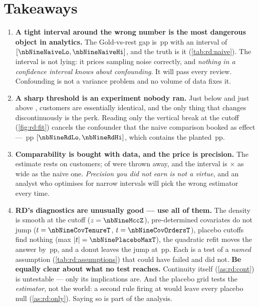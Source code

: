 \section{Takeaways}
\label{sec:rd:take}

\begin{enumerate}[leftmargin=*, itemsep=.45em]
  \item \textbf{A tight interval around the wrong number is the most dangerous object in
        analytics.} The Gold-vs-rest gap is \nbNineNaive{}\,pp with an interval of
        $[\nbNineNaiveLo, \nbNineNaiveHi]$, and the truth is \nbNineNaiveVerdict{} it
        (\cref{tab:rd:naive}). The interval is not lying: it prices sampling noise correctly, and
        \emph{nothing in a confidence interval knows about confounding}. It will pass every review.
        Confounding is not a variance problem and no volume of data fixes it.

  \item \textbf{A sharp threshold is an experiment nobody ran.} Just below and just above
        \eur{\nbNineCutoff}, customers are essentially identical, and the only thing that changes
        discontinuously is the perk. Reading only the vertical break at the cutoff
        (\cref{fig:rd:fit}) cancels the confounder that the naive comparison booked as effect ---
        \nbNineRd{}\,pp $[\nbNineRdLo, \nbNineRdHi]$, which contains the planted
        \nbNineTrueJump{}\,pp.

  \item \textbf{Comparability is bought with data, and the price is precision.} The estimate rests
        on \nbNineRdN{} customers; \nbNineRdDropped{} of \nbNineN{} were thrown away, and the
        interval is \nbNineWidthVsNaive$\times$ as wide as the naive one. \emph{Precision you did
        not earn is not a virtue}, and an analyst who optimises for narrow intervals will pick the
        wrong estimator every time.

  \item \textbf{RD's diagnostics are unusually good --- use all of them.} The density is smooth at
        the cutoff ($z = \nbNineMccZ$), pre-determined covariates do not jump
        ($t = \nbNineCovTenureT$, $t = \nbNineCovOrdersT$), \nbNinePlaceboN{} placebo cutoffs find
        nothing (max $|t| = \nbNinePlaceboMaxT$), the quadratic refit moves the answer by
        \nbNinePolyDiff{}\,pp, and a \eur{\nbNineDonutEps} donut leaves the jump at
        \nbNineDonut{}\,pp. Each is a
        test of a \emph{named} assumption (\cref{tab:rd:assumptions}) that could have failed and did
        not. \textbf{Be equally clear about what no test reaches.} Continuity itself
        (\cref{as:rd:cont}) is untestable --- only its implications are. And the placebo grid tests
        the \emph{estimator}, not the world: a second rule firing at \eur{\nbNineCutoff} would leave
        every placebo null (\cref{as:rd:only}). Saying so is part of the analysis.


\end{enumerate}

